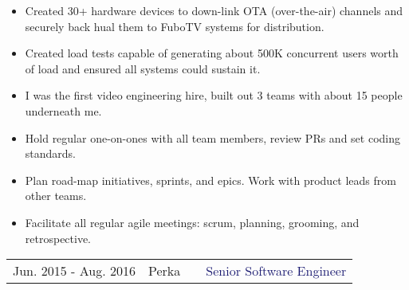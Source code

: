 \documentclass{article}
\begin{document}
\begin{multicols}{2}
\begin{small}
\begin{itemize}[leftmargin=*,label=\tiny{$\bullet$}]
    \item\begin{minipage}[t]{\linewidth}{Created 30+ hardware devices to down-link OTA (over-the-air) channels and securely back hual them to FuboTV systems for distribution.}\end{minipage}
    \item\begin{minipage}[t]{\linewidth}{Created load tests capable of generating about 500K concurrent users worth of load and ensured all systems could sustain it.}\end{minipage}
    \item\begin{minipage}[t]{\linewidth}{I was the first video engineering hire, built out 3 teams with about 15 people underneath me.}\end{minipage}
    \item\begin{minipage}[t]{\linewidth}{Hold regular one-on-ones with all team members, review PRs and set coding standards.}\end{minipage}
    \item\begin{minipage}[t]{\linewidth}{Plan road-map initiatives, sprints, and epics. Work with product leads from other teams.}\end{minipage}
    \item\begin{minipage}[t]{\linewidth}{Facilitate all regular agile meetings: scrum, planning, grooming, and retrospective.}\end{minipage}
    \end{itemize}
  \end{small} 
\end{multicols}

\vspace{15pt}\begin{tabularx}{\textwidth}{@{}llXr}
  Jun. 2015 - Aug. 2016&\textcolor{Mahogany}{Perka}&&\textcolor{MidnightBlue}{Senior Software Engineer}
\end{tabularx}
\end{document}
